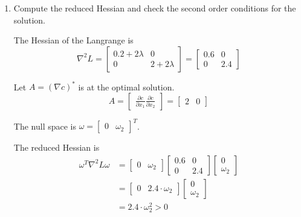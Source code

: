 \documentclass[a4paper,10pt]{article}
\begin{document}
\begin{enumerate}
\begin{enumerate}
        \item Compute the reduced Hessian and check the second order conditions for the solution.
        {\color{blue}
            The Hessian of the Langrange is
            \[
                \nabla^2 L = \begin{bmatrix} 0.2 + 2\lambda & 0 \\ 0 & 2 + 2\lambda \end{bmatrix} = \begin{bmatrix} 0.6 & 0 \\ 0 & 2.4 \end{bmatrix}
            \]
            
            Let $A = (\nabla c)^*$ is at the optimal solution.
            \[
                A = \begin{bmatrix} \frac{\partial c}{\partial x_1} \frac{\partial c}{\partial x_2} \end{bmatrix} = \begin{bmatrix} 2 & 0 \end{bmatrix}
            \]

            The null space is $\omega = \begin{bmatrix} 0 & \omega_2 \end{bmatrix}^T$.

            The reduced Hessian is
            \begin{align}
                \omega^T \nabla^2 L \omega &= 
                \begin{bmatrix} 0 & \omega_2 \end{bmatrix} 
                \begin{bmatrix} 0.6 & 0 \\ 0 & 2.4 \end{bmatrix} 
                \begin{bmatrix} 0 \\ \omega_2 \end{bmatrix} \\
                &= \begin{bmatrix} 0 & 2.4 \cdot \omega_2 \end{bmatrix} \begin{bmatrix} 0 \\ \omega_2 \end{bmatrix} \\
                &= 2.4 \cdot \omega_2^2 > 0
            \end{align}
        }
    \end{enumerate}



\end{enumerate}
\end{document}
